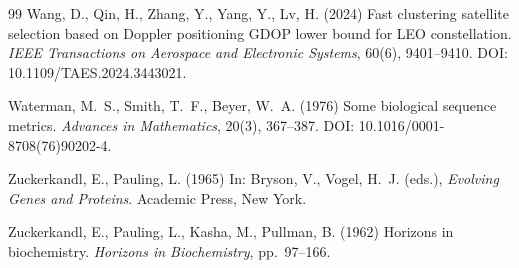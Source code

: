 \documentclass[11pt]{article}
\begin{document}
\begin{thebibliography}{99}
Wang, D., Qin, H., Zhang, Y., Yang, Y., Lv, H. (2024)
Fast clustering satellite selection based on Doppler positioning GDOP
lower bound for LEO constellation.
\emph{IEEE Transactions on Aerospace and Electronic Systems}, 60(6),
9401--9410.
DOI: 10.1109/TAES.2024.3443021.

Waterman, M.~S., Smith, T.~F., Beyer, W.~A. (1976)
Some biological sequence metrics.
\emph{Advances in Mathematics}, 20(3), 367--387.
DOI: 10.1016/0001-8708(76)90202-4.

Zuckerkandl, E., Pauling, L. (1965)
In: Bryson, V., Vogel, H.~J. (eds.),
\emph{Evolving Genes and Proteins}.
Academic Press, New York.

Zuckerkandl, E., Pauling, L., Kasha, M., Pullman, B. (1962)
Horizons in biochemistry.
\emph{Horizons in Biochemistry}, pp.~97--166.

\end{thebibliography}
\end{document}
